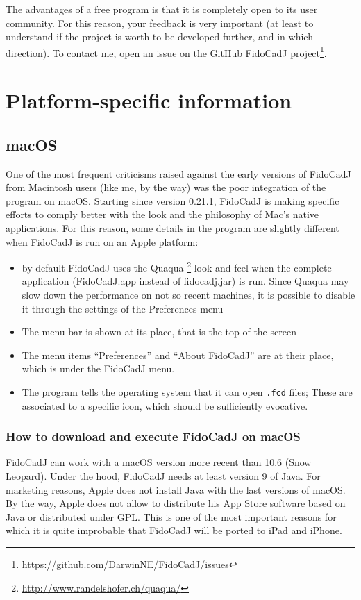 \documentclass[10pt,a4paper,twoside]{scrreprt}
\begin{document}
The advantages of a free program is that it is completely open
to its user community. For this reason, your feedback is very
important (at least to understand if the project is worth to be developed
further, and in which direction). To contact me, open an issue on the GitHub FidoCadJ  project\footnote{\href{https://github.com/DarwinNE/FidoCadJ/issues}{https://github.com/DarwinNE/FidoCadJ/issues}}.

\appendix

\chapter{Platform-specific information} \label{specifics}


\section{macOS}

One of the most frequent criticisms raised against the early versions
of FidoCadJ from Macintosh users (like me, by the way) was the poor
integration of the program on macOS. Starting since version 0.21.1,
FidoCadJ is making specific efforts to comply better with the look
and the philosophy of Mac's native applications. For this reason,
some details in the program are slightly different when FidoCadJ is
run on an Apple platform:
\begin{itemize}
\item by default FidoCadJ uses the Quaqua%
\footnote{\href{http://www.randelshofer.ch/quaqua/}{http://www.randelshofer.ch/quaqua/}%
} look and feel when the complete application (FidoCadJ.app
instead of fidocadj.jar) is run. Since Quaqua
may slow down the performance on not so recent machines, it is possible
to disable it through the settings of the Preferences menu
\item The menu bar is shown at its place, that is the top of the screen
\item The menu items ``Preferences'' and ``About FidoCadJ'' are
at their place, which is under the FidoCadJ menu.
\item The program tells the operating system that it can open \lstinline!.fcd!
files; These are associated to a specific icon, which should be sufficiently
evocative.
\end{itemize}

\subsection{How to download and execute FidoCadJ on macOS}
FidoCadJ can work with a macOS version more recent than 10.6 (Snow Leopard).
Under the hood, FidoCadJ needs at least version 9 of Java. For marketing reasons, Apple does not install Java with the last versions of macOS. By the way, Apple does not allow to distribute his App Store software based on Java or distributed under GPL. This is one of the most important reasons for which it is quite improbable that FidoCadJ will be ported to iPad and iPhone.
\end{document}

